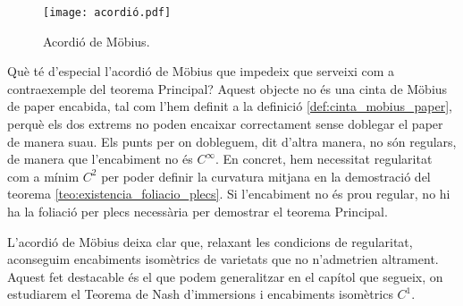 \begin{figure}[htbp]
    \centering
    \texttt{[image: acordió.pdf]}
    \caption{Acordió de Möbius.}
    \label{fig:acordio_mobius}
\end{figure}

Què té d'especial l'acordió de Möbius que impedeix que serveixi com a contraexemple del teorema Principal? Aquest objecte no és una cinta de Möbius de paper encabida, tal com l'hem definit a la definició \ref{def:cinta_mobius_paper}, perquè els dos extrems no poden encaixar correctament sense doblegar el paper de manera suau. Els punts per on dobleguem, dit d'altra manera, no són regulars, de manera que l'encabiment no és $C^\infty$. En concret, hem necessitat regularitat com a mínim $C^2$ per poder definir la curvatura mitjana en la demostració del teorema \ref{teo:existencia_foliacio_plecs}. Si l'encabiment no és prou regular, no hi ha la foliació per plecs necessària per demostrar el teorema Principal. 

L'acordió de Möbius deixa clar que, relaxant les condicions de regularitat, aconseguim encabiments isomètrics de varietats que no n'admetrien altrament. Aquest fet destacable és el que podem generalitzar en el capítol que segueix, on estudiarem el Teorema de Nash d'immersions i encabiments isomètrics $C^1$.

\newpage